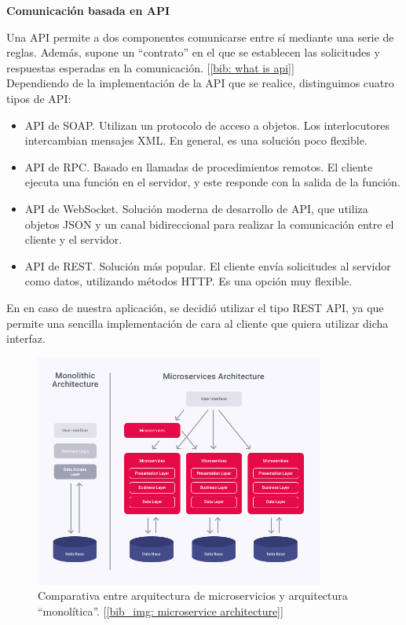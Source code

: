 \documentclass[a4paper, oneside, 12pt]{book}
\begin{document}
	\pagebreak
	
	\noindent \textbf{\large Comunicación basada en \textbf{API}} \\
	\label{sec: api}
	
	\noindent Una API permite a dos componentes comunicarse entre sí mediante una serie de reglas. Además, supone un ``contrato'' en el que se establecen las solicitudes y respuestas esperadas en la comunicación. [\ref{bib: what is api}] \\
	
	\noindent Dependiendo de la implementación de la API que se realice, distinguimos cuatro tipos de API:
	
	\begin{itemize}
		\item API de SOAP. Utilizan un protocolo de acceso a objetos. Los interlocutores intercambian mensajes XML. En general, es una solución poco flexible.
		
		\item API de RPC. Basado en llamadas de procedimientos remotos. El cliente ejecuta una función en el servidor, y este responde con la salida de la función.
		
		\item API de WebSocket. Solución moderna de desarrollo de API, que utiliza objetos JSON y un canal bidireccional para realizar la comunicación entre el cliente y el servidor.
		
		\item API de REST. Solución más popular. El cliente envía solicitudes al servidor como datos, utilizando métodos HTTP. Es una opción muy flexible.
	\end{itemize}
	
	\noindent En en caso de nuestra aplicación, se decidió utilizar el tipo REST API, ya que permite una sencilla implementación de cara al cliente que quiera utilizar dicha interfaz.
	
	\begin{figure}[h!]
		\begin{center}
			\includegraphics[width=0.85\textwidth]{img/microservice_architecture.png}
			\caption{Comparativa entre arquitectura de microservicios y arquitectura ``monolítica''. [\ref{bib_img: microservice architecture}]}
			\label{img: microservice architecture}
		\end{center}
	\end{figure}
	
\end{document}

